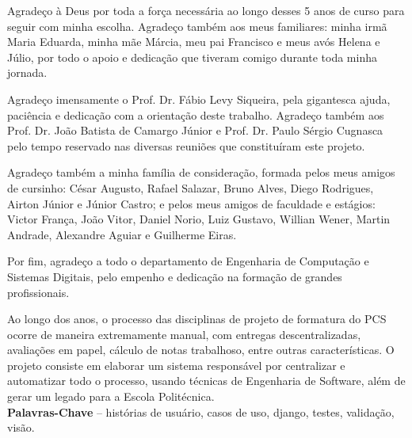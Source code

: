 \documentclass[]{politex}
\begin{document}
\capa
\falsafolhaderosto
\folhaderosto








\begin{agradecimentos}
Agradeço à Deus por toda a força necessária ao longo desses 5 anos de curso para seguir com minha escolha. Agradeço também aos meus familiares: minha irmã Maria Eduarda, minha mãe Márcia, meu pai Francisco e meus avós Helena e Júlio, por todo o apoio e dedicação que tiveram comigo durante toda minha jornada.

Agradeço imensamente o Prof. Dr. Fábio Levy Siqueira, pela gigantesca ajuda, paciência e dedicação com a orientação deste trabalho. Agradeço também aos Prof. Dr. João Batista de Camargo Júnior e Prof. Dr. Paulo Sérgio Cugnasca pelo tempo reservado nas diversas reuniões que constituíram este projeto.

Agradeço também a minha família de consideração, formada pelos meus amigos de cursinho: César Augusto, Rafael Salazar, Bruno Alves, Diego Rodrigues, Airton Júnior e Júnior Castro; e pelos meus amigos de faculdade e estágios: Victor França, João Vitor, Daniel Norio, Luiz Gustavo, Willian Wener, Martin Andrade, Alexandre Aguiar e Guilherme Eiras.

Por fim, agradeço a todo o departamento de Engenharia de Computação e Sistemas Digitais, pelo empenho e dedicação na formação de grandes profissionais.
\end{agradecimentos}




\begin{resumo}
Ao longo dos anos, o processo das disciplinas de projeto de formatura do PCS ocorre de maneira extremamente manual, com entregas descentralizadas, avaliações em papel, cálculo de notas trabalhoso, entre outras características. O projeto consiste em elaborar um sistema responsável por centralizar e automatizar todo o processo, usando técnicas de Engenharia de Software, além de gerar um legado para a Escola Politécnica.
%
\\[3\baselineskip]
%
\textbf{Palavras-Chave} -- histórias de usuário, casos de uso, django, testes, validação, visão.
\end{resumo}
\end{document}
